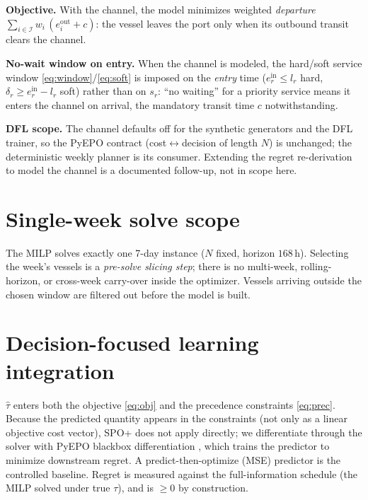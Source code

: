 \documentclass[11pt]{article}
\newcommand{\I}{\mathcal{I}}
\begin{document}
\textbf{Objective.} With the channel, the model minimizes weighted
\emph{departure} $\sum_{i\in\I} w_i\,(e^{\mathrm{out}}_i + c)$: the vessel leaves
the port only when its outbound transit clears the channel.

\textbf{No-wait window on entry.} When the channel is modeled, the hard/soft
service window \eqref{eq:window}/\eqref{eq:soft} is imposed on the
\emph{entry} time ($e^{\mathrm{in}}_r\le l_r$ hard, $\delta_r\ge
e^{\mathrm{in}}_r-l_r$ soft) rather than on $s_r$: ``no waiting'' for a priority
service means it enters the channel on arrival, the mandatory transit time $c$
notwithstanding.

\textbf{DFL scope.} The channel defaults off for the synthetic generators and
the DFL trainer, so the PyEPO contract (cost$\leftrightarrow$decision of length
$N$) is unchanged; the deterministic weekly planner is its consumer. Extending
the regret re-derivation to model the channel is a documented follow-up, not in
scope here.

\section{Single-week solve scope}
The MILP solves exactly one 7-day instance ($N$ fixed, horizon $168$\,h).
Selecting the week's vessels is a \emph{pre-solve slicing step}; there is no
multi-week, rolling-horizon, or cross-week carry-over inside the optimizer.
Vessels arriving outside the chosen window are filtered out before the model is
built.

\section{Decision-focused learning integration}\label{sec:dfl}
$\hat\tau$ enters both the objective \eqref{eq:obj} and the precedence
constraints \eqref{eq:prec}. Because the predicted quantity appears in the
constraints (not only as a linear objective cost vector), SPO+
\citep{elmachtoub2022spo} does not apply directly; we differentiate through the
solver with PyEPO blackbox differentiation \citep{pogancic2020blackbox}, which
trains the predictor to minimize downstream regret. A predict-then-optimize
(MSE) predictor is the controlled baseline. Regret is measured against the
full-information schedule (the MILP solved under true $\tau$), and is
$\ge 0$ by construction.


\end{document}
